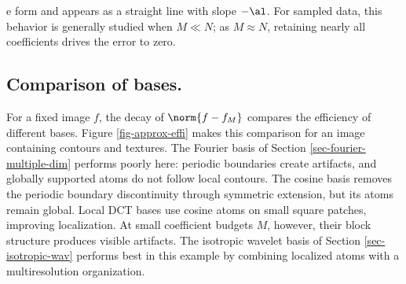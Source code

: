 e form
and appears as a straight line with slope $-\al$. For sampled data, this behavior is generally studied when $M \ll N$; as $M \approx N$, retaining nearly all coefficients drives the error to zero.






   
\subsection{Comparison of bases.}

For a fixed image $f$, the decay of $\norm{f-f_M}$ compares the efficiency of different bases. Figure \ref{fig-approx-effi} makes this comparison for an image containing contours and textures. The Fourier basis of Section \ref{sec-fourier-multiple-dim} performs poorly here: periodic boundaries create artifacts, and globally supported atoms do not follow local contours. The cosine basis removes the periodic boundary discontinuity through symmetric extension, but its atoms remain global. Local DCT bases use cosine atoms on small square patches, improving localization. At small coefficient budgets $M$, however, their block structure produces visible artifacts. The isotropic wavelet basis of Section \ref{sec-isotropic-wav} performs best in this example by combining localized atoms with a multiresolution organization.


